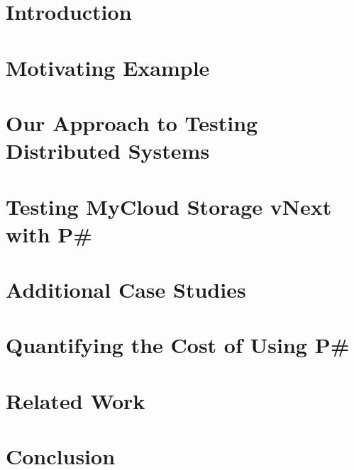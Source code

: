 \documentclass[letterpaper,twocolumn,10pt]{article}
\newcommand{\psharp}{P\#\xspace}
\newcommand{\Azure}{MyCloud\xspace}
\begin{document}
\section{Introduction}
\label{sec:intro}



\section{Motivating Example}
\label{sec:motivation}



\section{Our Approach to Testing Distributed Systems}
\label{sec:overview}



\section{Testing \Azure Storage vNext with \psharp}
\label{sec:method}



\section{Additional Case Studies}
\label{sec:cases}



\section{Quantifying the Cost of Using \psharp}
\label{sec:eval}



\section{Related Work}
\label{sec:rw}



\section{Conclusion}
\label{sec:conclusion}





\balance

{\footnotesize 
}
\end{document}
